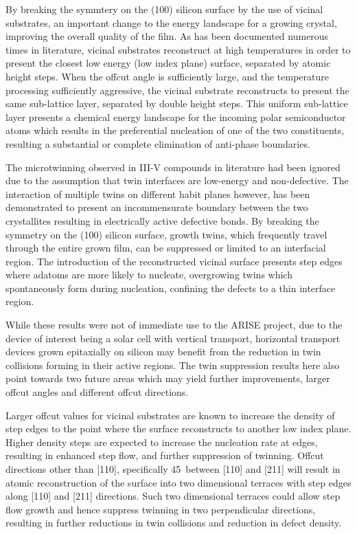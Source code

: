 By breaking the symmtery on the (100) silicon surface by the use of vicinal substrates, an important change to the energy landscape for a growing crystal, improving the overall quality of the film.
As has been documented numerous times in literature, vicinal substrates reconstruct at high temperatures in order to present the closest low energy (low index plane) surface, separated by atomic height steps.
When the offcut angle is sufficiently large, and the temperature processing sufficiently aggressive, the vicinal substrate reconstructs to present the same sub-lattice layer, separated by double height steps.
This uniform sub-lattice layer presents a chemical energy landscape for the incoming polar semiconductor atoms which results in the preferential nucleation of one of the two constituents, resulting a substantial or complete elimination of anti-phase boundaries.

The microtwinning observed in III-V compounds in literature had been ignored due to the assumption that twin interfaces are low-energy and non-defective.
The interaction of multiple twins on different habit planes however, has been demonstrated to present an incommensurate boundary between the two crystallites resulting in electrically active defective bonds.
By breaking the symmetry on the (100) silicon surface, growth twins, which frequently travel through the entire grown film, can be suppressed or limited to an interfacial region.
The introduction of the reconstructed vicinal surface presents step edges where adatoms are more likely to nucleate, overgrowing twins which spontaneously form during nucleation, confining the defects to a thin interface region.

While these results were not of immediate use to the ARISE project, due to the device of interest being a solar cell with vertical transport, horizontal transport devices grown epitaxially on silicon may benefit from the reduction in twin collisions forming in their active regions.
The twin suppression results here also point towards two future areas which may yield further improvements, larger offcut angles and different offcut directions.

Larger offcut values for vicinal substrates are known to increase the density of step edges to the point where the surface reconstructs to another low index plane.
Higher density steps are expected to increase the nucleation rate at edges, resulting in enhanced step flow, and further suppression of twinning.
Offcut directions other than [110], specifically 45\degree~between [110] and [211] will result in atomic reconstruction of the surface into two dimensional terraces with step edges along [110] and [211] directions.
Such two dimensional terraces could allow step flow growth and hence suppress twinning in two perpendicular directions, resulting in further reductions in twin collisions and reduction in defect density.
